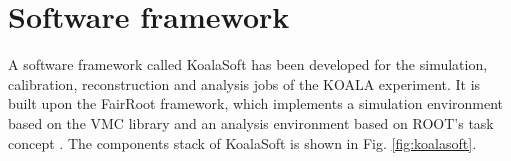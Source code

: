 \documentclass[number,5p]{elsarticle}
\begin{document}

\section{Software framework}
\label{sec:software}

A software framework called KoalaSoft has been developed for the simulation, calibration, reconstruction and analysis jobs of the KOALA experiment.
It is built upon the FairRoot \cite{fairroot} framework, which implements a
simulation environment based on the VMC \cite{vmc} library and an analysis
environment based on ROOT's task concept \cite{root}.
The components stack of KoalaSoft is shown in Fig. \ref{fig:koalasoft}.
\end{document}
